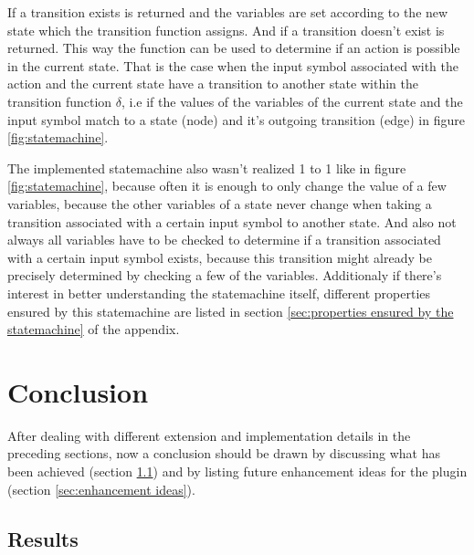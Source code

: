 \documentclass{report}
\begin{document}
If a transition exists  is returned and the variables are set according to the new state which the transition function assigns. And if a transition doesn't exist  is returned. This way the function  can be used to determine if an action is possible in the current state. That is the case when the input symbol associated with the action and the current state have a transition to another state within the transition function $\delta$, i.e if the values of the variables of the current state and the input symbol match to a state (node) and it's outgoing transition (edge) in figure \ref{fig:statemachine}.

The implemented statemachine also wasn't realized 1 to 1 like in figure \ref{fig:statemachine}, because often it is enough to only change the value of a few variables, because the other variables of a state never change when taking a transition associated with a certain input symbol to another state. And also not always all variables have to be checked to determine if a transition associated with a certain input symbol exists, because this transition might already be precisely determined by checking a few of the variables. Additionaly if there's interest in better understanding the statemachine itself, different properties ensured by this statemachine are listed in section \ref{sec:properties ensured by the statemachine} of the appendix.


\vspace{0.5cm}
\chapter{Conclusion}

After dealing with different extension and implementation details in the preceding sections, now a conclusion should be drawn by discussing what has been achieved (section \ref{sec:results}) and by listing future enhancement ideas for the plugin (section \ref{sec:enhancement ideas}).

\section{Results}
\label{sec:results}
\end{document}
